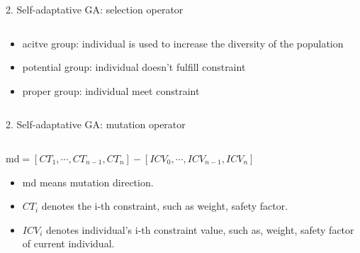 \documentclass{beamer}
\begin{document}
\begin{frame}{2. Self-adaptative GA: selection operator}
    \begin{columns}[c]
    \begin{column}{0.8\textwidth}
		\begin{itemize}
			\item acitve group: individual is used to increase the diversity of the population
			\item potential group: individual doesn't fulfill constraint
			\item proper group: individual meet constraint
		\end{itemize}
		
    \end{column}
\end{columns}
\end{frame}

\begin{frame}{2. Self-adaptative GA:  mutation operator}
    \begin{columns}[c]
    \begin{column}{1\textwidth}
		$\text{md} = [CT_1, \cdots, CT_{n-1}, CT_n] -  [ICV_0, \cdots, ICV_{n-1},
		ICV_n]$ \\
		\begin{itemize}
			\item  md means mutation direction.
			\item  $CT_i$ denotes the i-th constraint, such as weight, safety factor.
			\item  $ICV_i$ denotes individual's i-th constraint value, such as,  weight, safety
				factor of current individual.
		\end{itemize}

    \end{column}
\end{columns}
\end{frame}
\end{document}
